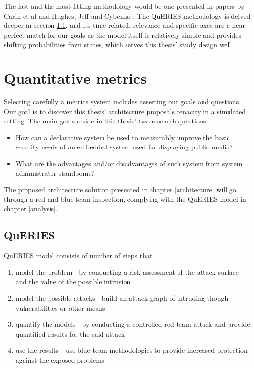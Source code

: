 The last and the most fitting methodology would be one presented in
papers by Carin et al and Hughes, Jeff and Cybenko
\cite{carin2008cybersecurity, hughes2013quantitative}. The
QuERIES methodology is delved deeper in section \ref{queries}, and
its time-related, relevance and specific
axes are a near-perfect match for our goals as the model itself is
relatively simple and provides shifting probabilities from states,
which serves this thesis' study design well.

\section{Quantitative metrics} \label{quantitativemetrics}

Selecting carefully a metrics system includes asserting our goals and
questions. Our goal is to discover this thesis' architecture proposals
tenacity in a simulated setting. The main goals reside in this thesis'
two research questions:

\begin{itemize}
\item How can a declarative system be used to measurably improve the basic
  security needs of an embedded system used for displaying public
  media?
\item What are the advantages and/or disadvantages of such system from
  system administrator standpoint?
\end{itemize}

The proposed architecture solution presented in chapter
\ref{architecture} will go through a red and blue team inspection,
complying with the QuERIES model in chapter \ref{analysis}.

\subsection{QuERIES} \label{queries}
QuERIES model consists of number of steps that

\begin{enumerate}
  \item model the problem - by conducting a risk assessment of the
    attack surface and the value of the possible intrusion
  \item model the possible attacks - build an attack graph of
    intruding though vulnerabilities or other means
  \item quantify the models - by conducting a controlled red team
    attack and provide quantified results for the said attack
  \item use the results - use blue team methodologies to provide
    increased protection against the exposed problems
  
\end{enumerate}

